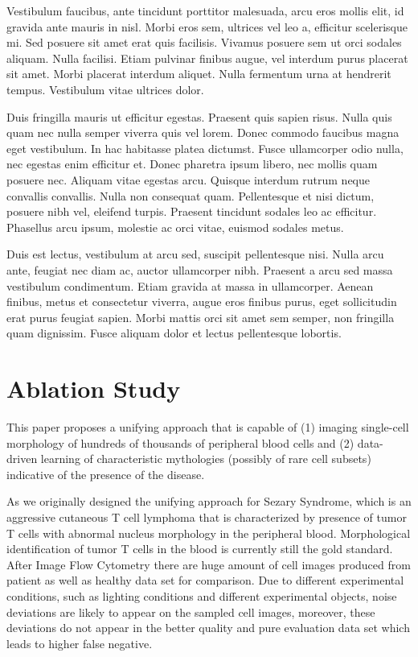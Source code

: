 Vestibulum faucibus, ante tincidunt porttitor malesuada, arcu eros mollis elit, id gravida ante mauris in nisl. Morbi eros sem, ultrices vel leo a, efficitur scelerisque mi. Sed posuere sit amet erat quis facilisis. Vivamus posuere sem ut orci sodales aliquam. Nulla facilisi. Etiam pulvinar finibus augue, vel interdum purus placerat sit amet. Morbi placerat interdum aliquet. Nulla fermentum urna at hendrerit tempus. Vestibulum vitae ultrices dolor.

Duis fringilla mauris ut efficitur egestas. Praesent quis sapien risus. Nulla quis quam nec nulla semper viverra quis vel lorem. Donec commodo faucibus magna eget vestibulum. In hac habitasse platea dictumst. Fusce ullamcorper odio nulla, nec egestas enim efficitur et. Donec pharetra ipsum libero, nec mollis quam posuere nec. Aliquam vitae egestas arcu. Quisque interdum rutrum neque convallis convallis. Nulla non consequat quam. Pellentesque et nisi dictum, posuere nibh vel, eleifend turpis. Praesent tincidunt sodales leo ac efficitur. Phasellus arcu ipsum, molestie ac orci vitae, euismod sodales metus.

Duis est lectus, vestibulum at arcu sed, suscipit pellentesque nisi. Nulla arcu ante, feugiat nec diam ac, auctor ullamcorper nibh. Praesent a arcu sed massa vestibulum condimentum. Etiam gravida at massa in ullamcorper. Aenean finibus, metus et consectetur viverra, augue eros finibus purus, eget sollicitudin erat purus feugiat sapien. Morbi mattis orci sit amet sem semper, non fringilla quam dignissim. Fusce aliquam dolor et lectus pellentesque lobortis. 






\chapter{Ablation Study}
\label{sec:examples}
This paper proposes a unifying approach that is capable of (1) imaging single-cell morphology of hundreds of thousands of peripheral blood cells and (2) data-driven learning of characteristic mythologies (possibly of rare cell subsets) indicative of the presence of the disease.

As we originally designed the unifying approach for Sezary Syndrome, which is an aggressive cutaneous T cell lymphoma that is characterized by presence of tumor T cells with abnormal nucleus morphology in the peripheral blood. Morphological identification of tumor T cells in the blood is currently still the gold standard.
After Image Flow Cytometry there are huge amount of cell images produced from patient as well as healthy data set for comparison. Due to different experimental conditions, such as lighting conditions and different experimental objects, noise deviations are likely to appear on the sampled cell images, moreover, these deviations do not appear in the better quality and pure evaluation data set which leads to higher false negative.
